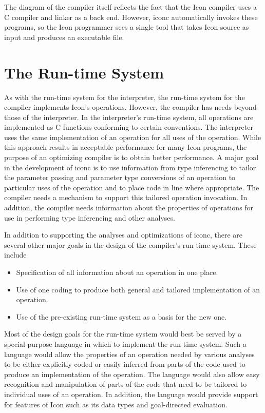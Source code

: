 The diagram of the compiler itself reflects the fact that the Icon
compiler uses a C compiler and linker as a back end.  However, iconc
automatically invokes these programs, so the Icon programmer sees a
single tool that takes Icon source as input and produces an executable
file.


\section{The Run-time System}

As with the run-time system for the interpreter, the run-time system
for the compiler implements Icon's operations.  However, the compiler
has needs beyond those of the interpreter. In the interpreter's
run-time system, all operations are implemented as C functions
conforming to certain conventions. The interpreter uses the same
implementation of an operation for all uses of the operation. While
this approach results in acceptable performance for many Icon
programs, the purpose of an optimizing compiler is to obtain better
performance. A major goal in the development of iconc is to use
information from type inferencing to tailor the parameter passing and
parameter type conversions of an operation to particular uses of the
operation and to place code in line where appropriate. The compiler
needs a mechanism to support this tailored operation invocation. In
addition, the compiler needs information about the properties of
operations for use in performing type inferencing and other analyses.

In addition to supporting the analyses and optimizations of iconc,
there are several other major goals in the design of the compiler's
run-time system. These include

\liststyleLxx
\begin{itemize}

\item Specification of all information about an operation in one place. 

\item Use of one coding to produce both general and tailored
implementation of an operation.

\item Use of the pre-existing run-time system as a basis for the new one. 

\end{itemize}

Most of the design goals for the run-time system would best be served
by a special-purpose language in which to implement the run-time
system. Such a language would allow the properties of an operation
needed by various analyses to be either explicitly coded or easily
inferred from parts of the code used to produce an implementation of
the operation. The language would also allow easy recognition and
manipulation of parts of the code that need to be tailored to
individual uses of an operation. In addition, the language would
provide support for features of Icon such as its data types and
goal-directed evaluation.

